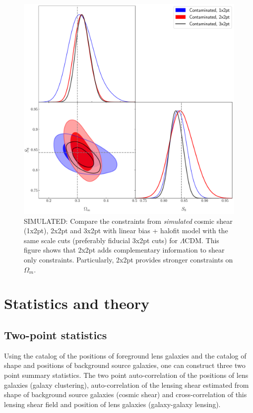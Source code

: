 \documentclass[fleqn,usenatbib]{mnras}
\begin{document}
\begin{figure}
\includegraphics[width=\columnwidth]{figs/compare_all_cosmo_3x2pt_lcdm_contaminated.pdf}
\caption[]{SIMULATED: Compare the constraints from \textit{simulated} cosmic shear (1x2pt),  2x2pt and 3x2pt  with linear bias + halofit model with the same scale cuts (preferably fiducial 3x2pt cuts) for $\Lambda$CDM. This figure shows that 2x2pt adds complementary information to shear only constraints. Particularly, 2x2pt provides stronger constraints on $\Omega_m$.}
\label{fig:des_comp}
\end{figure}


\section{Statistics and theory}
\label{sec:stat_theory}
\subsection{Two-point statistics}
Using the catalog of the positions of foreground lens galaxies and the catalog of shape and positions of background source galaxies, one can construct three two point summary statistics. The two point auto-correlation of the positions of lens galaxies (galaxy clustering), auto-correlation of the lensing shear estimated from shape of background source galaxies (cosmic shear) and  cross-correlation of this lensing shear field and position of lens galaxies (galaxy-galaxy lensing). 
\end{document}

